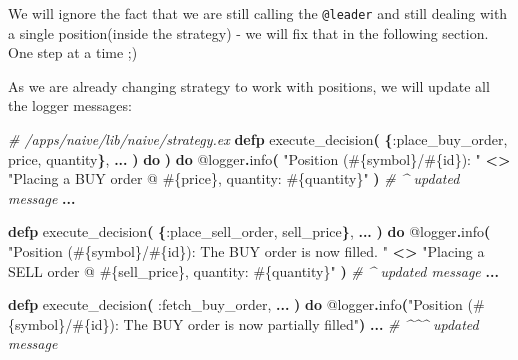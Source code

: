 \documentclass[
  oneside]{book}
\newenvironment{Shaded}{\begin{snugshade}}{\end{snugshade}}
\newcommand{\CommentTok}[1]{\textcolor[rgb]{0.56,0.35,0.01}{\textit{#1}}}
\newcommand{\FunctionTok}[1]{\textcolor[rgb]{0.13,0.29,0.53}{\textbf{#1}}}
\newcommand{\KeywordTok}[1]{\textcolor[rgb]{0.13,0.29,0.53}{\textbf{#1}}}
\newcommand{\NormalTok}[1]{#1}
\newcommand{\OperatorTok}[1]{\textcolor[rgb]{0.81,0.36,0.00}{\textbf{#1}}}
\newcommand{\OtherTok}[1]{\textcolor[rgb]{0.56,0.35,0.01}{#1}}
\newcommand{\StringTok}[1]{\textcolor[rgb]{0.31,0.60,0.02}{#1}}
\newcommand{\VariableTok}[1]{\textcolor[rgb]{0.00,0.00,0.00}{#1}}
\begin{document}
We will ignore the fact that we are still calling the \texttt{@leader} and still dealing with a single position(inside the strategy) - we will fix that in the following section. One step at a time ;)

As we are already changing strategy to work with positions, we will update all the logger messages:

\begin{Shaded}
\begin{Highlighting}[]
  \CommentTok{\# /apps/naive/lib/naive/strategy.ex}
  \KeywordTok{defp}\NormalTok{ execute\_decision}\FunctionTok{(}
         \FunctionTok{\{}\VariableTok{:place\_buy\_order}\NormalTok{, price, quantity}\FunctionTok{\}}\NormalTok{,}
         \OperatorTok{...}
  \FunctionTok{)} \KeywordTok{do}
       \FunctionTok{)} \KeywordTok{do}
    \OtherTok{@logger}\OperatorTok{.}\NormalTok{info}\FunctionTok{(}
      \StringTok{"Position (}\OtherTok{\#\{}\NormalTok{symbol}\OtherTok{\}}\StringTok{/}\OtherTok{\#\{}\NormalTok{id}\OtherTok{\}}\StringTok{): "} \OperatorTok{\textless{}\textgreater{}}
        \StringTok{"Placing a BUY order @ }\OtherTok{\#\{}\NormalTok{price}\OtherTok{\}}\StringTok{, quantity: }\OtherTok{\#\{}\NormalTok{quantity}\OtherTok{\}}\StringTok{"}
    \FunctionTok{)} \CommentTok{\# \^{} updated message}
  \OperatorTok{...}

    \KeywordTok{defp}\NormalTok{ execute\_decision}\FunctionTok{(}
         \FunctionTok{\{}\VariableTok{:place\_sell\_order}\NormalTok{, sell\_price}\FunctionTok{\}}\NormalTok{,}
         \OperatorTok{...}
       \FunctionTok{)} \KeywordTok{do}
    \OtherTok{@logger}\OperatorTok{.}\NormalTok{info}\FunctionTok{(}
      \StringTok{"Position (}\OtherTok{\#\{}\NormalTok{symbol}\OtherTok{\}}\StringTok{/}\OtherTok{\#\{}\NormalTok{id}\OtherTok{\}}\StringTok{): The BUY order is now filled. "} \OperatorTok{\textless{}\textgreater{}}
        \StringTok{"Placing a SELL order @ }\OtherTok{\#\{}\NormalTok{sell\_price}\OtherTok{\}}\StringTok{, quantity: }\OtherTok{\#\{}\NormalTok{quantity}\OtherTok{\}}\StringTok{"}
    \FunctionTok{)} \CommentTok{\# \^{} updated message}
    \OperatorTok{...}

  \KeywordTok{defp}\NormalTok{ execute\_decision}\FunctionTok{(}
         \VariableTok{:fetch\_buy\_order}\NormalTok{,}
         \OperatorTok{...}
       \FunctionTok{)} \KeywordTok{do}
    \OtherTok{@logger}\OperatorTok{.}\NormalTok{info}\FunctionTok{(}\StringTok{"Position (}\OtherTok{\#\{}\NormalTok{symbol}\OtherTok{\}}\StringTok{/}\OtherTok{\#\{}\NormalTok{id}\OtherTok{\}}\StringTok{): The BUY order is now partially filled"}\FunctionTok{)}
    \OperatorTok{...} \CommentTok{\# \^{}\^{}\^{} updated message}


\end{Highlighting}
\end{Shaded}
\end{document}
